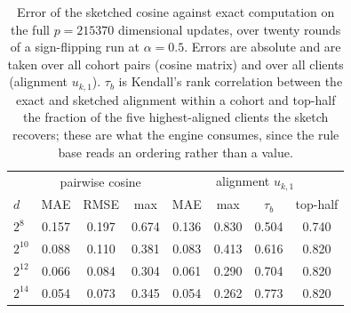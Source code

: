 \begin{table}[!t]
\centering
\caption{Error of the sketched cosine against exact computation on the full $p=215370$ dimensional updates, over twenty rounds of a sign-flipping run at $\alpha=0.5$. Errors are absolute and are taken over all cohort pairs (cosine matrix) and over all clients (alignment $u_{k,1}$). $\tau_b$ is Kendall's rank correlation between the exact and sketched alignment within a cohort and top-half the fraction of the five highest-aligned clients the sketch recovers; these are what the engine consumes, since the rule base reads an ordering rather than a value.}
\label{tab:sketch}
\setlength{\tabcolsep}{4pt}
\footnotesize
\begin{tabular}{lccccccc}
\hline
& \multicolumn{3}{c}{pairwise cosine} & \multicolumn{4}{c}{alignment $u_{k,1}$}\\
$d$ & MAE & RMSE & max & MAE & max & $\tau_b$ & top-half\\
\hline
$2^{8}$ & 0.157 & 0.197 & 0.674 & 0.136 & 0.830 & 0.504 & 0.740 \\
$2^{10}$ & 0.088 & 0.110 & 0.381 & 0.083 & 0.413 & 0.616 & 0.820 \\
$2^{12}$ & 0.066 & 0.084 & 0.304 & 0.061 & 0.290 & 0.704 & 0.820 \\
$2^{14}$ & 0.054 & 0.073 & 0.345 & 0.054 & 0.262 & 0.773 & 0.820 \\
\hline
\end{tabular}
\end{table}
